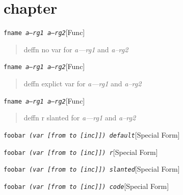 \documentclass{book}
\begin{document}
\label{anchor:Top}%
\chapter{{chapter}}
\label{anchor:chapter}%

\noindent\texttt{fname \EmbracOn{}\textnormal{\textsl{a---rg1 a--rg2}}\EmbracOff{}}\hfill[Func]



%
\begin{quote}
\unskip{\parskip=0pt\noindent}%
deffn no var for \textsl{a---rg1} and \textsl{a--rg2}
\end{quote}

\noindent\texttt{fname \EmbracOn{}\textnormal{\textsl{\textsl{a---rg1} \textsl{a--rg2}}}\EmbracOff{}}\hfill[Func]



%
\begin{quote}
\unskip{\parskip=0pt\noindent}%
deffn explict var for \textsl{a---rg1} and \textsl{a--rg2}
\end{quote}

\noindent\texttt{fname \EmbracOn{}\textnormal{\textsl{\EmbracOff{}\textnormal{\textsl{a---rg1}}\EmbracOn{} \EmbracOff{}\textnormal{\textsl{a--rg2}}\EmbracOn{}}}\EmbracOff{}}\hfill[Func]



%
\begin{quote}
\unskip{\parskip=0pt\noindent}%
deffn r slanted for \textsl{a---rg1} and \textsl{a--rg2}
\end{quote}

\noindent\texttt{foobar \EmbracOn{}\textnormal{\textsl{(var [from to [inc]]) default}}\EmbracOff{}}\hfill[Special Form]



%
\noindent\texttt{foobar \EmbracOn{}\textnormal{\textsl{(var \EmbracOff{}\textnormal{[}\EmbracOn{}from to \EmbracOff{}\textnormal{[}\EmbracOn{}inc\EmbracOff{}\textnormal{]]}\EmbracOn{}) r}}\EmbracOff{}}\hfill[Special Form]



%
\noindent\texttt{foobar \EmbracOn{}\textnormal{\textsl{(var \textsl{[}from to \textsl{[}inc\textsl{]]}) slanted}}\EmbracOff{}}\hfill[Special Form]



%
\noindent\texttt{foobar \EmbracOn{}\textnormal{\textsl{(var \texttt{[}from to \texttt{[}inc\texttt{]]}) code}}\EmbracOff{}}\hfill[Special Form]
\end{document}
